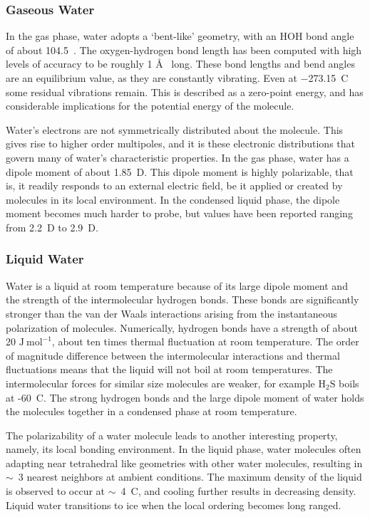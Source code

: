 \subsubsection{Gaseous Water}
In the gas phase, water adopts a `bent-like' geometry, with an HOH
bond angle of about 104.5\degree~. The oxygen-hydrogen bond length has
been computed with high levels of accuracy to be roughly 1 \AA~
long. These bond lengths and bend angles are an equilibrium value, as
they are constantly vibrating. Even at $-$273.15~\degree C some
residual vibrations remain. This is described as a zero-point energy,
and has considerable implications for the potential energy of the
molecule.

Water's electrons are not symmetrically distributed about the
molecule. This gives rise to higher order multipoles, and it is these
electronic distributions that govern many of water's characteristic
properties. In the gas phase, water has a dipole moment of about
1.85~D. This dipole moment is highly polarizable, that is, it readily
responds to an external electric field, be it applied or created by
molecules in its local environment. In the condensed liquid phase, the
dipole moment becomes much harder to probe, but values have been
reported ranging from 2.2~D to 2.9~D.


\subsubsection{Liquid Water}
Water is a liquid at room temperature because of its large dipole
moment and the strength of the intermolecular hydrogen bonds. These
bonds are significantly stronger than the van der Waals interactions
arising from the instantaneous polarization of molecules. Numerically,
hydrogen bonds have a strength of about 20
$\mathrm{J}~\mathrm{mol}^{-1}$, about ten times thermal fluctuation at
room temperature. The order of magnitude difference between the
intermolecular interactions and thermal fluctuations means that the
liquid will not boil at room temperatures. The intermolecular forces
for similar size molecules are weaker, for example
$\mathrm{H}_2\mathrm{S}$ boils at -60\degree~C. The strong hydrogen
bonds and the large dipole moment of water holds the molecules
together in a condensed phase at room temperature.

The polarizability of a water molecule leads to another interesting
property, namely, its local bonding environment. In the liquid phase,
water molecules often adapting near tetrahedral like geometries with other
water molecules, resulting in $\sim$~3 nearest neighbors at ambient
conditions. The maximum density of the liquid is observed to occur at
$\sim$~4\degree~C, and cooling further results in decreasing
density. Liquid water transitions to ice when the local ordering
becomes long ranged.



